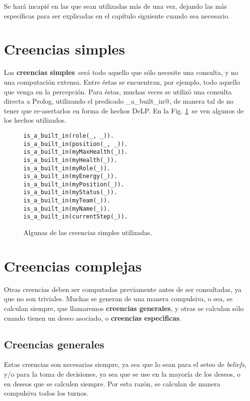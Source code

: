 \documentclass[oneside]{book}
\begin{document}
Se hará incapié en las que sean utilizadas más de una vez, dejando las más específicas
para ser explicadas en el capítulo siguiente cuando sea necesario.


\section{Creencias simples}

Las \textbf{creencias simples}\ será todo aquello que sólo necesite una consulta, y no
una computación extensa. Entre éstas se encuentran, por ejemplo, todo aquello que venga
en la percepción. Para éstas, muchas veces se utilizó una consulta directa a Prolog,
utilizando el predicado \verb@is_a_built_in@, de manera tal de no tener que 
re-asertarlos en forma de hechos DeLP. En la Fig. \ref{fig:creenciasSimples}\ se ven
algunos de los hechos utilizados.

\begin{figure}
\begin{verbatim}
is_a_built_in(role(_, _)).
is_a_built_in(position(_, _)).
is_a_built_in(myMaxHealth(_)).
is_a_built_in(myHealth(_)).
is_a_built_in(myRole(_)).
is_a_built_in(myEnergy(_)).
is_a_built_in(myPosition(_)).
is_a_built_in(myStatus(_)).
is_a_built_in(myTeam(_)).
is_a_built_in(myName(_)).
is_a_built_in(currentStep(_)).
\end{verbatim}
\caption{Algunas de las creencias simples utilizadas.}
\label{fig:creenciasSimples}
\end{figure}


\section{Creencias complejas}

Otras creencias deben ser computadas previamente antes de ser consultadas, ya que no
son triviales. Muchas se generan de una manera compulsiva, o sea, se calculan siempre,
que llamaremos \textbf{creencias generales},
y otras se calculan sólo cuando tienen un deseo asociado, o \textbf{creencias 
especìficas}.


\subsection{Creencias generales}

\label{sec:creenciasGenerales}

Estas creencias son necesarias siempre, ya sea que lo sean para el seteo de 
\textit{beliefs}, y/o para la toma de decisiones, ya sea que se use en la mayoría
de los deseos, o en deseos que se calculen siempre. Por esta razón, se calculan
de manera compulsiva todos los turnos.
\end{document}
